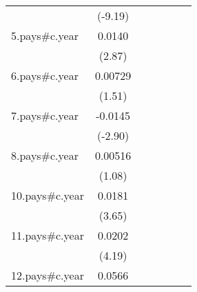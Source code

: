 {\begin{tabular}{l*{6}{c}}
                    &     (-9.19)         &                     &                     &                     &                     &                     \\
[1em]
5.pays#c.year       &      0.0140\sym{**} &                     &                     &                     &                     &                     \\
                    &      (2.87)         &                     &                     &                     &                     &                     \\
[1em]
6.pays#c.year       &     0.00729         &                     &                     &                     &                     &                     \\
                    &      (1.51)         &                     &                     &                     &                     &                     \\
[1em]
7.pays#c.year       &     -0.0145\sym{**} &                     &                     &                     &                     &                     \\
                    &     (-2.90)         &                     &                     &                     &                     &                     \\
[1em]
8.pays#c.year       &     0.00516         &                     &                     &                     &                     &                     \\
                    &      (1.08)         &                     &                     &                     &                     &                     \\
[1em]
10.pays#c.year      &      0.0181\sym{***}&                     &                     &                     &                     &                     \\
                    &      (3.65)         &                     &                     &                     &                     &                     \\
[1em]
11.pays#c.year      &      0.0202\sym{***}&                     &                     &                     &                     &                     \\
                    &      (4.19)         &                     &                     &                     &                     &                     \\
[1em]
12.pays#c.year      &      0.0566\sym{***}&                     &                     &                     &                     &                     \\

\end{tabular}}
